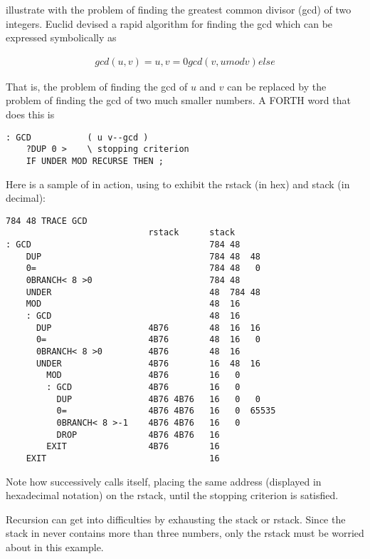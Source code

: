  illustrate with the problem of finding the greatest common divisor (gcd) of two integers. Euclid devised a rapid algorithm for finding the gcd which can be expressed symbolically as

\begin{align}
    gcd(u,v) = u, v= 0
    gcd(v, u mod v) else
\end{align}
    
That is, the problem of finding the gcd of $u$ and $v$ can be replaced by the problem of finding the gcd of two much smaller numbers. A FORTH word that does this is

\begin{lstlisting}
: GCD           ( u v--gcd )
    ?DUP 0 >    \ stopping criterion
    IF UNDER MOD RECURSE THEN ;
\end{lstlisting}

Here is a sample of  in action, using  to exhibit the rstack (in hex) and stack (in decimal):

\begin{lstlisting}
784 48 TRACE GCD
                            rstack      stack
: GCD                                   784 48
    DUP                                 784 48  48
    0=                                  784 48   0
    0BRANCH< 8 >0                       784 48
    UNDER                               48  784 48
    MOD                                 48  16
    : GCD                               48  16
      DUP                   4B76        48  16  16
      0=                    4B76        48  16   0
      0BRANCH< 8 >0         4B76        48  16
      UNDER                 4B76        16  48  16
        MOD                 4B76        16   0
        : GCD               4B76        16   0
          DUP               4B76 4B76   16   0   0
          0=                4B76 4B76   16   0  65535
          0BRANCH< 8 >-1    4B76 4B76   16   0
          DROP              4B76 4B76   16
        EXIT                4B76        16
    EXIT                                16
\end{lstlisting}

Note how  successively calls itself, placing the same address (displayed in hexadecimal notation) on the rstack, until the stopping criterion is satisfied.

Recursion can get into difficulties by exhausting the stack or rstack. Since the stack in  never contains more than three numbers, only the rstack must be worried about in this example.

